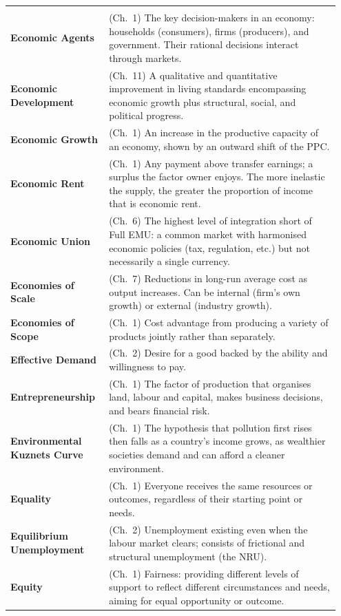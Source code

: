 \documentclass[11pt, a4paper, twoside]{book}
\begin{document}
\begin{longtable}{@{}>{\RaggedRight\arraybackslash}p{0.28\linewidth}>{\RaggedRight\arraybackslash}p{0.67\linewidth}@{}}
\multicolumn{2}{@{}l}{\textbf{\Large\color{CurveNavy} E}} \\[2pt]
\textbf{Economic Agents} & (Ch.~1) The key decision-makers in an economy: households (consumers), firms (producers), and government. Their rational decisions interact through markets. \\
\textbf{Economic Development} & (Ch.~11) A qualitative and quantitative improvement in living standards encompassing economic growth plus structural, social, and political progress. \\
\textbf{Economic Growth} & (Ch.~1) An increase in the productive capacity of an economy, shown by an outward shift of the PPC. \\
\textbf{Economic Rent} & (Ch.~1) Any payment above transfer earnings; a surplus the factor owner enjoys. The more inelastic the supply, the greater the proportion of income that is economic rent. \\
\textbf{Economic Union} & (Ch.~6) The highest level of integration short of Full EMU: a common market with harmonised economic policies (tax, regulation, etc.) but not necessarily a single currency. \\
\textbf{Economies of Scale} & (Ch.~7) Reductions in long-run average cost as output increases. Can be internal (firm's own growth) or external (industry growth). \\
\textbf{Economies of Scope} & (Ch.~1) Cost advantage from producing a variety of products jointly rather than separately. \\
\textbf{Effective Demand} & (Ch.~2) Desire for a good backed by the ability and willingness to pay. \\
\textbf{Entrepreneurship} & (Ch.~1) The factor of production that organises land, labour and capital, makes business decisions, and bears financial risk. \\
\textbf{Environmental Kuznets Curve} & (Ch.~1) The hypothesis that pollution first rises then falls as a country's income grows, as wealthier societies demand and can afford a cleaner environment. \\
\textbf{Equality} & (Ch.~1) Everyone receives the same resources or outcomes, regardless of their starting point or needs. \\
\textbf{Equilibrium Unemployment} & (Ch.~2) Unemployment existing even when the labour market clears; consists of frictional and structural unemployment (the NRU). \\
\textbf{Equity} & (Ch.~1) Fairness: providing different levels of support to reflect different circumstances and needs, aiming for equal opportunity or outcome. \\

\end{longtable}
\end{document}
